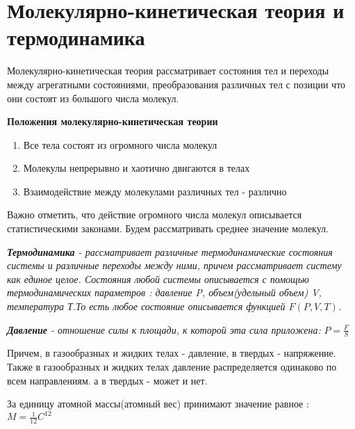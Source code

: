\chapter{Молекулярно-кинетическая теория и термодинамика}

Молекулярно-кинетическая теория рассматривает состояния тел и переходы между агрегатными состояниями, преобразования различных тел с позиции что они состоят из большого числа молекул.

\vspace{5px}

\textbf{Положения молекулярно-кинетическая теории}
\begin{enumerate}
    \item Все тела состоят из огромного числа молекул
    \item Молекулы непрерывно и хаотично двигаются в телах
    \item Взаимодействие между молекулами различных тел - различно
\end{enumerate}
Важно отметить, что действие огромного числа молекул описывается статистическими законами. Будем рассматривать среднее значение молекул.

\vspace{5px}

 \textit{\textbf{Термодинамика} - рассматривает различные термодинамические состояния системы и различные переходы между ними, причем рассматривает систему как единое целое. Состояния любой системы описывается с помощью термодинамических параметров : давление P, объем(удельный объем) V, температура Т.То есть любое состояние описывается функцией $F(P, V, T)$. }

\vspace{5px}

 \textit{\textbf{Давление} - отношение силы к площади, к которой эта сила приложена:} $P = \frac{F}{S}$

\vspace{5px}

Причем, в газообразных и жидких телах - давление, в твердых - напряжение. Также в газообразных и жидких телах давление распределяется одинаково по всем направлениям. а в твердых - может и нет.

\vspace{5px}

За единицу атомной массы(атомный вес) принимают значение равное : $ M = \frac{1}{12}C^{12}$

\vspace{5px}


